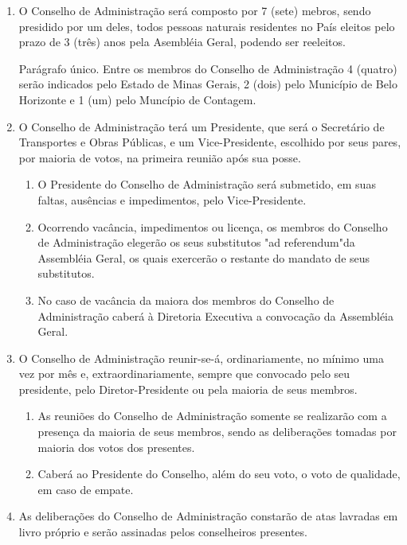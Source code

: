 \documentclass[a4paper,11pt]{report}
\begin{document}
\begin{enumerate}[resume, label=Art. \arabic*]
\item O Conselho de Administração será composto por 7 (sete) mebros, sendo presidido por um deles, todos pessoas naturais residentes no País eleitos pelo prazo de 3 (três) anos pela Asembléia Geral, podendo ser reeleitos.

Parágrafo único. Entre os membros do Conselho de Administração 4 (quatro) serão indicados pelo Estado de Minas Gerais, 2 (dois) pelo Município de Belo Horizonte e 1 (um) pelo Muncípio de Contagem.

\item O Conselho de Administração terá um Presidente, que será o Secretário de Transportes e Obras Públicas, e um Vice-Presidente, escolhido por seus pares, por maioria de votos, na primeira reunião após sua posse.

\begin{enumerate}[label= \S \arabic*]
    \item O Presidente do Conselho de Administração será submetido, em suas faltas, ausências e impedimentos, pelo Vice-Presidente.
    \item Ocorrendo vacância, impedimentos ou licença, os membros do Conselho de Administração elegerão os seus substitutos "ad referendum"da Assembléia Geral, os quais exercerão o restante do mandato de seus substitutos.
    \item No caso de vacância da maiora dos membros do Conselho de Administração caberá à Diretoria Executiva a convocação da Assembléia Geral.
\end{enumerate}

\item O Conselho de Administração reunir-se-á, ordinariamente, no mínimo uma vez por mês e, extraordinariamente, sempre que convocado pelo seu presidente, pelo Diretor-Presidente ou pela maioria de seus membros.

\begin{enumerate}[label= \S \arabic*]
    \item As reuniões do Conselho de Administração somente se realizarão com a presença da maioria de seus membros, sendo as deliberações tomadas por maioria dos votos dos presentes.
    \item Caberá ao Presidente do Conselho, além do seu voto, o voto de qualidade, em caso de empate.
\end{enumerate}

\item As deliberações do Conselho de Administração constarão de atas lavradas em livro próprio e serão assinadas pelos conselheiros presentes.


\end{enumerate}
\end{document}
